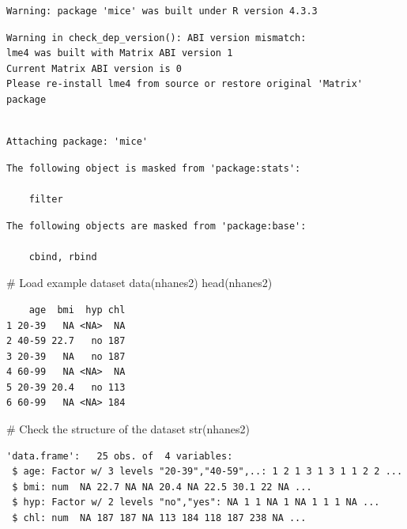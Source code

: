 \documentclass[
  letterpaper,
  DIV=11,
  numbers=noendperiod]{scrreprt}
\newenvironment{Shaded}{\begin{snugshade}}{\end{snugshade}}
\newcommand{\CommentTok}[1]{\textcolor[rgb]{0.37,0.37,0.37}{#1}}
\newcommand{\FunctionTok}[1]{\textcolor[rgb]{0.28,0.35,0.67}{#1}}
\newcommand{\NormalTok}[1]{\textcolor[rgb]{0.00,0.23,0.31}{#1}}
\begin{document}
\begin{verbatim}
Warning: package 'mice' was built under R version 4.3.3
\end{verbatim}

\begin{verbatim}
Warning in check_dep_version(): ABI version mismatch: 
lme4 was built with Matrix ABI version 1
Current Matrix ABI version is 0
Please re-install lme4 from source or restore original 'Matrix' package
\end{verbatim}

\begin{verbatim}

Attaching package: 'mice'
\end{verbatim}

\begin{verbatim}
The following object is masked from 'package:stats':

    filter
\end{verbatim}

\begin{verbatim}
The following objects are masked from 'package:base':

    cbind, rbind
\end{verbatim}

\begin{Shaded}
\begin{Highlighting}[]
\CommentTok{\# Load example dataset}
\FunctionTok{data}\NormalTok{(nhanes2)}
\FunctionTok{head}\NormalTok{(nhanes2)}
\end{Highlighting}
\end{Shaded}

\begin{verbatim}
    age  bmi  hyp chl
1 20-39   NA <NA>  NA
2 40-59 22.7   no 187
3 20-39   NA   no 187
4 60-99   NA <NA>  NA
5 20-39 20.4   no 113
6 60-99   NA <NA> 184
\end{verbatim}

\begin{Shaded}
\begin{Highlighting}[]
\CommentTok{\# Check the structure of the dataset}
\FunctionTok{str}\NormalTok{(nhanes2)}
\end{Highlighting}
\end{Shaded}

\begin{verbatim}
'data.frame':   25 obs. of  4 variables:
 $ age: Factor w/ 3 levels "20-39","40-59",..: 1 2 1 3 1 3 1 1 2 2 ...
 $ bmi: num  NA 22.7 NA NA 20.4 NA 22.5 30.1 22 NA ...
 $ hyp: Factor w/ 2 levels "no","yes": NA 1 1 NA 1 NA 1 1 1 NA ...
 $ chl: num  NA 187 187 NA 113 184 118 187 238 NA ...
\end{verbatim}
\end{document}
